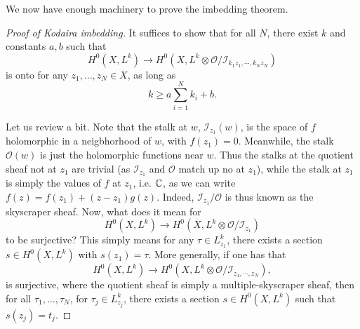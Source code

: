 \documentclass{../mathnotes}
\begin{document}
We now have enough machinery to prove the imbedding theorem.

\begin{proof}[Proof of Kodaira imbedding]
     It suffices to show that for all $N$, there exist $k$ and constants $a,b$ such that
     \[H^0(X,L^k)\to H^0(X,L^k\otimes\mathcal{O}/\mathcal{I}_{k_1z_1,\cdots,k_Nz_N})\]
     is onto for any $z_1,\ldots,z_N\in X$, as long as 
     \[k\geq a\sum_{i=1}^Nk_i+b.\]

     Let us review a bit. Note that the stalk at $w$, $\mathcal{I}_{z_1}(w)$, is the space of $f$ holomorphic in a neigbhorhood of $w$, with $f(z_1)=0$.
     Meanwhile, the stalk $\mathcal{O}(w)$ is just the holomorphic functions near $w$. Thus the stalks at the quotient sheaf not at
     $z_1$ are trivial (as $\mathcal{I}_{z_1}$ and $\mathcal{O}$ match up no at $z_1$), while the stalk at $z_1$ is simply 
     the values of $f$ at $z_1$, i.e. $\mathbb{C}$, as we can write $f(z)=f(z_1)+(z-z_1)g(z)$. Indeed, $\mathcal{I}_{z_1}/\mathcal{O}$
     is thus known as the skyscraper sheaf. Now, what does it mean for
     \[H^0(X,L^k)\to H^0(X,L^k\otimes\mathcal{O}/\mathcal{I}_{z_1})\]
     to be surjective? This simply means for any $\tau\in L^k_{z_1}$, there exists a section $s\in H^0(X,L^k)$ with
     $s(z_1)=\tau$. More generally, if one has that
     \[H^0(X,L^k)\to H^0(X,L^k\otimes \mathcal{O}/\mathcal{I}_{z_1,\cdots,z_N}),\]
     is surjective, where the quotient sheaf is simply a multiple-skyscraper sheaf, then for all $\tau_1,\ldots,\tau_N$,
     for $\tau_j\in L^k_{z_j}$, there exists a section $s\in H^0(X,L^k)$ such that $s(z_j)=t_j$.


\end{proof}
\end{document}
